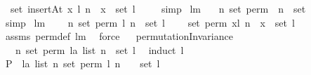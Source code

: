 \begin{isabellebody}
\ \ {\isachardoublequoteopen}set\ {\isacharparenleft}insertAt\ x\ l\ n{\isacharparenright}\ {\isacharequal}\ {\isacharbraceleft}x{\isacharbraceright}\ {\isasymunion}\ set\ l{\isachardoublequoteclose}\ \isanewline
%
\isadelimproof
\ \ %
\endisadelimproof
%
\isatagproof
{}\isamarkupfalse%
\ simp%
\endisatagproof
{\isafoldproof}%
%
\isadelimproof
\isanewline
%
\endisadelimproof
\isanewline
{}\isamarkupfalse%
\ lm{}{}{}{\isacharcolon}\ \isanewline
\ \ {\isachardoublequoteopen}{\isasymforall}n{\isachardot}\ set\ {\isacharparenleft}perm{}\ {\isacharbrackleft}{\isacharbrackright}\ n{\isacharparenright}\ {\isacharequal}\ set\ {\isacharbrackleft}{\isacharbrackright}{\isachardoublequoteclose}\ \isanewline
%
\isadelimproof
\ \ %
\endisadelimproof
%
\isatagproof
{}\isamarkupfalse%
\ simp%
\endisatagproof
{\isafoldproof}%
%
\isadelimproof
\isanewline
%
\endisadelimproof
\isanewline
{}\isamarkupfalse%
\ lm{}{}{}{\isacharcolon}\ \isanewline
\ \ \ {\isachardoublequoteopen}{\isasymforall}n{\isachardot}\ {\isacharparenleft}set\ {\isacharparenleft}perm{}\ l\ n{\isacharparenright}\ {\isacharequal}\ set\ l{\isacharparenright}{\isachardoublequoteclose}\ \isanewline
\ \ \ {\isachardoublequoteopen}set\ {\isacharparenleft}perm{}\ {\isacharparenleft}x{\isacharhash}l{\isacharparenright}\ n{\isacharparenright}\ {\isacharequal}\ {\isacharbraceleft}x{\isacharbraceright}\ {\isasymunion}\ set\ l{\isachardoublequoteclose}\ \isanewline
%
\isadelimproof
\ \ %
\endisadelimproof
%
\isatagproof
{}\isamarkupfalse%
\ assms\ perm{}{\isacharunderscore}def\ lm{}{}{}\ \isamarkupfalse%
\ force%
\endisatagproof
{\isafoldproof}%
%
\isadelimproof
\isanewline
%
\endisadelimproof
\isanewline
\ \isanewline
{}\isamarkupfalse%
\ permutationInvariance{\isacharcolon}\ \isanewline
\ \ \ {\isachardoublequoteopen}{\isasymforall}n{\isachardot}\ set\ {\isacharparenleft}perm{}\ {\isacharparenleft}l{\isacharcolon}{\isacharcolon}{\isacharprime}a\ list{\isacharparenright}\ n{\isacharparenright}\ {\isacharequal}\ set\ l{\isachardoublequoteclose}\ \isanewline
%
\isadelimproof
%
\endisadelimproof
%
\isatagproof
{}\isamarkupfalse%
\ {\isacharparenleft}induct\ l{\isacharparenright}\isanewline
\ \ \ \isamarkupfalse%
\ {\isacharquery}P\ {\isacharequal}\ {\isachardoublequoteopen}{\isacharpercent}l{\isacharcolon}{\isacharcolon}{\isacharparenleft}{\isacharprime}a\ list{\isacharparenright}{\isachardot}\ {\isacharparenleft}{\isasymforall}n{\isachardot}\ set\ {\isacharparenleft}perm{}\ l\ n{\isacharparenright}\ \ {\isacharequal}\ \ set\ l{\isacharparenright}{\isachardoublequoteclose}\isanewline

\end{isabellebody}

